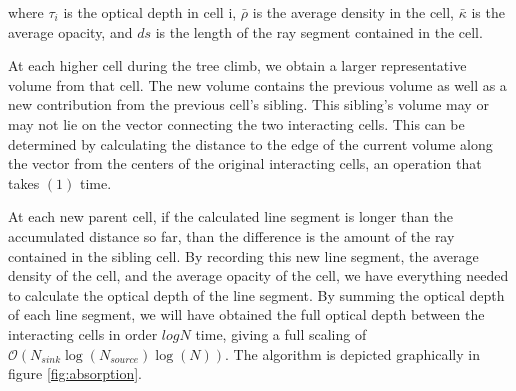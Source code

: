 where $\tau_i$ is the optical depth in cell i, $\bar{\rho}$ is the average density in the cell, $\bar{\kappa}$ is the average opacity, and $ds$ is the length of the ray segment contained in the cell.

At each higher cell during the tree climb, we obtain a larger representative volume from that cell. The new volume contains the previous volume as well as a new contribution from the previous cell's sibling. This sibling's volume may or may not lie on the vector connecting the two interacting cells. This can be determined by calculating the distance to the edge of the current volume along the vector from the centers of the original interacting cells, an operation that takes $\mathcal{(1)}$ time.

At each new parent cell, if the calculated line segment is longer than the accumulated distance so far, than the difference is the amount of the ray contained in the sibling cell. By recording this new line segment, the average density of the cell, and the average opacity of the cell, we have everything needed to calculate the optical depth of the line segment. By summing the optical depth of each line segment, we will have obtained the full optical depth between the interacting cells in order $log{N}$ time, giving a full scaling of $\mathcal{O}(N_{sink}\log(N_{source})\log(N))$. The algorithm is depicted graphically in figure \ref{fig:absorption}.


